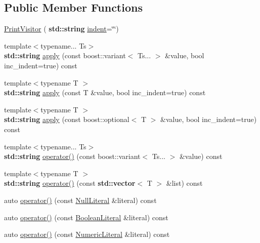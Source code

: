 \subsection*{Public Member Functions}
\begin{DoxyCompactItemize}
\item 
\hyperlink{struct_print_visitor_a113b1e0ee300672fc7f8ca96911a1f2f}{Print\+Visitor} (\textbf{ std\+::string} \hyperlink{struct_print_visitor_a6cda79fa0db4cc99a40958601fbbcc37}{indent}=\char`\"{}\char`\"{})
\item 
{\footnotesize template$<$typename... Ts$>$ }\\\textbf{ std\+::string} \hyperlink{struct_print_visitor_aad3821f1c2546fed4bb51ae79067ddbb}{apply} (const boost\+::variant$<$ Ts... $>$ \&value, bool inc\+\_\+indent=true) const
\item 
{\footnotesize template$<$typename T $>$ }\\\textbf{ std\+::string} \hyperlink{struct_print_visitor_ad6b9b3967b7355d3b62959cf29aef94e}{apply} (const T \&value, bool inc\+\_\+indent=true) const
\item 
{\footnotesize template$<$typename T $>$ }\\\textbf{ std\+::string} \hyperlink{struct_print_visitor_a6f3f12087aa58e605075e993876bfb89}{apply} (const boost\+::optional$<$ T $>$ \&value, bool inc\+\_\+indent=true) const
\item 
{\footnotesize template$<$typename... Ts$>$ }\\\textbf{ std\+::string} \hyperlink{struct_print_visitor_aff884e9fac6b8acea4e6608c4fe7eafd}{operator()} (const boost\+::variant$<$ Ts... $>$ \&value) const
\item 
{\footnotesize template$<$typename T $>$ }\\\textbf{ std\+::string} \hyperlink{struct_print_visitor_ad17a4608e0fce125b756cdbc5860660b}{operator()} (const \textbf{ std\+::vector}$<$ T $>$ \&list) const
\item 
auto \hyperlink{struct_print_visitor_a381e3fa143f2c8e8c85d86e5ed6441b5}{operator()} (const \hyperlink{struct_null_literal}{Null\+Literal} \&literal) const
\item 
auto \hyperlink{struct_print_visitor_a24a148187b20cd3f11ebaf7414024d3a}{operator()} (const \hyperlink{struct_boolean_literal}{Boolean\+Literal} \&literal) const
\item 
auto \hyperlink{struct_print_visitor_aa99f46059d380f55159e1a8f8c07603e}{operator()} (const \hyperlink{struct_numeric_literal}{Numeric\+Literal} \&literal) const

\end{DoxyCompactItemize}
